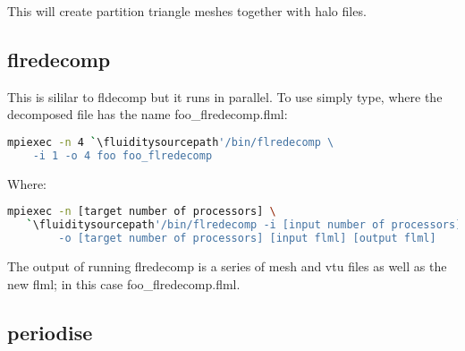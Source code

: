 This will create partition triangle meshes together with halo files. 


\subsection{flredecomp}
\label{mesh!meshing tools!flredecomp}
This is sililar to fldecomp but it runs in parallel. To use simply type, where the decomposed file has the
name foo\_flredecomp.flml:

\begin{lstlisting}[language=bash]
mpiexec -n 4 `\fluiditysourcepath'/bin/flredecomp \
    -i 1 -o 4 foo foo_flredecomp
\end{lstlisting}

Where:

\begin{lstlisting}[language=bash]
mpiexec -n [target number of processors] \
   `\fluiditysourcepath'/bin/flredecomp -i [input number of processors] \
        -o [target number of processors] [input flml] [output flml]
\end{lstlisting}

The output of running flredecomp is a series of mesh and vtu files as well as the new flml; in this case foo\_flredecomp.flml.

\subsection{periodise}


